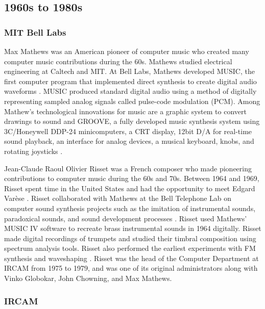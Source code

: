 \documentclass[letterpaper, 12pt]{article}
\begin{document}
\subsection{1960s to 1980s}

\subsubsection{MIT Bell Labs}


%
Max Mathews was an American pioneer of computer music who created many computer music contributions during the 60s.
%
Mathews studied electrical engineering at Caltech and MIT.
%
At Bell Labs, Mathews developed MUSIC, the first computer program that implemented direct synthesis to create digital audio waveforms \citep{clarke2020inside}.
%
MUSIC produced standard digital audio using a method of digitally representing sampled analog signals called pulse-code modulation (PCM).
%
Among Mathew's technological innovations for music are a graphic system to convert drawings to sound and GROOVE, a fully developed music synthesis system using 3C/Honeywell DDP-24 minicomputers, a CRT display, 12bit D/A for real-time sound playback, an interface for analog devices, a musical keyboard, knobs, and rotating joysticks \citep{bogdanov2001all}.


%
Jean-Claude Raoul Olivier Risset was a French composer who made pioneering contributions to computer music during the 60s and 70s.
%
Between 1964 and 1969, Risset spent time in the United States and had the opportunity to meet Edgard Varèse \citep{warszawski2013risset}.
%
Risset collaborated with Mathews at the Bell Telephone Lab on computer sound synthesis projects such as the imitation of instrumental sounds, paradoxical sounds, and sound development processes \citep{warszawski2013risset}.
%
Risset used Mathews' MUSIC IV software to recreate brass instrumental sounds in 1964 digitally.
%
Risset made digital recordings of trumpets and studied their timbral composition using spectrum analysis tools.
%
Risset also performed the earliest experiments with FM synthesis and waveshaping \citep{ircam2021risset}.
%
Risset was the head of the Computer Department at IRCAM from 1975 to 1979, and was one of its original administrators along with Vinko Globokar, John Chowning, and Max Mathews.

\subsubsection{IRCAM}
\end{document}
